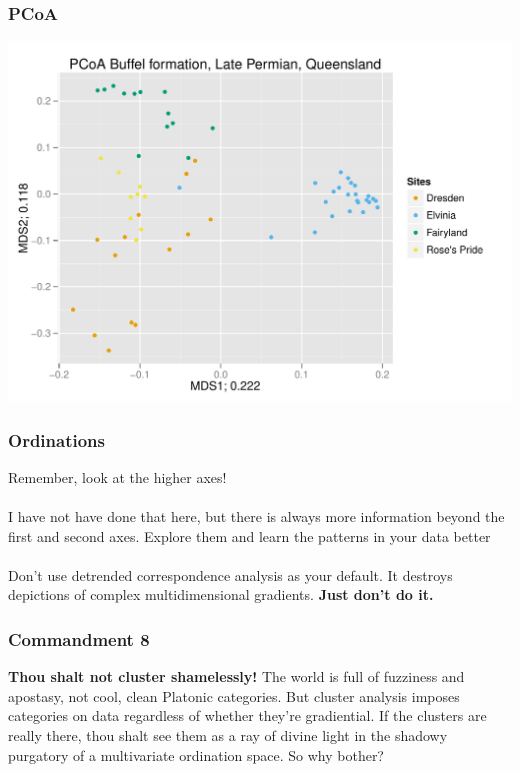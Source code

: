 \documentclass{beamer}\usepackage{graphicx, color}
\makeatletter
\def\maxwidth{ %
  \ifdim\Gin@nat@width>\linewidth
    \linewidth
  \else
    \Gin@nat@width
  \fi
}
\newenvironment{knitrout}{}{} %
\makeatother
\begin{document}
\begin{frame}
\frametitle{PCoA}

\begin{knitrout}
\color{fgcolor}\includegraphics[width=\maxwidth]{figure/buffel-pcoa} 
\end{knitrout}


\end{frame}


\begin{frame}
\frametitle{Ordinations}
\large{Remember, look at the higher axes!}
\\~\\
I have not have done that here, but there is always more information beyond the first and second axes.
Explore them and learn the patterns in your data better
\\~\\
Don't use detrended correspondence analysis as your default. It destroys depictions of complex multidimensional gradients. \textbf{Just don't do it.}

\end{frame}


\begin{frame}
\frametitle{Commandment 8}
\textbf{Thou shalt not cluster shamelessly!} 
The world is full of fuzziness and apostasy, not cool, clean Platonic categories. 
But cluster analysis imposes categories on data regardless of whether they're gradiential. 
If the clusters are really there, thou shalt see them as a ray of divine light in the shadowy purgatory of a multivariate ordination space. 
So why bother?
\end{frame}
\end{document}
